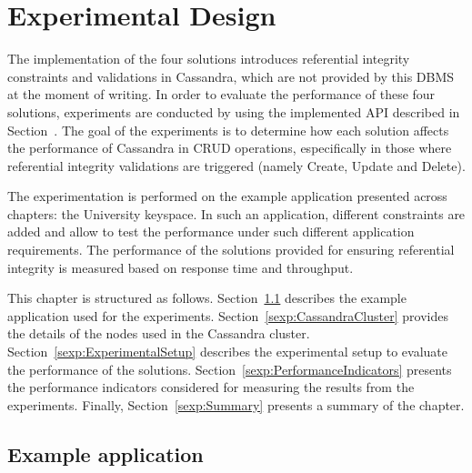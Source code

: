 \chapter{Experimental Design}


The implementation of the four solutions  introduces referential integrity
constraints and validations in Cassandra, which are 
not provided by this \ac{DBMS} at the moment of writing. In order to evaluate
 the performance of these four solutions, experiments are 
  conducted by using the implemented \ac{API} described in
  Section~.   The goal of the experiments is to determine how
  each solution affects the performance of  Cassandra in \ac{CRUD}
  operations, especifically in those where referential integrity validations are
  triggered (namely Create, Update and Delete).

The experimentation is performed on the example application presented across
chapters: the University keyspace. In such an application, different constraints
are added and allow to test the performance under such different application
requirements. The performance of the  solutions provided for ensuring
referential integrity  is measured based on response time and throughput.

This chapter is structured as follows.
Section~\ref{sexp:BenchmarkKeyspace} describes the example application 
used for the experiments. Section~\ref{sexp:CassandraCluster} provides the
details of the nodes used in the Cassandra cluster. Section~\ref{sexp:ExperimentalSetup}
describes the experimental setup to evaluate the performance of the solutions.
Section~\ref{sexp:PerformanceIndicators} presents the performance indicators
 considered for measuring the results from the experiments. Finally,
Section~\ref{sexp:Summary} presents a summary of the chapter.


\section{Example application} \label{sexp:BenchmarkKeyspace}

